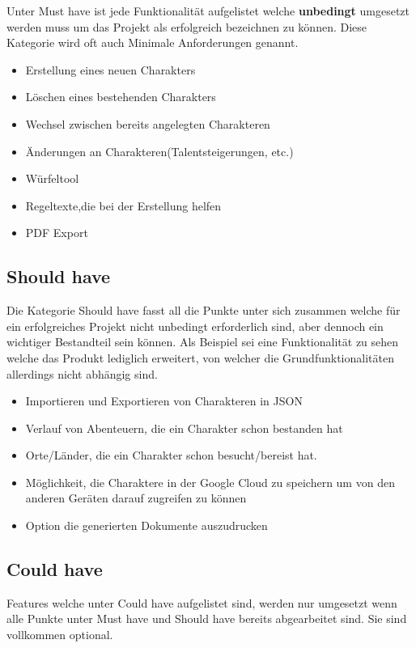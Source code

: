 Unter \grqq Must have\grqq{} ist jede Funktionalität aufgelistet welche \textbf{unbedingt} umgesetzt werden muss um das Projekt als erfolgreich bezeichnen zu können. Diese Kategorie wird oft auch \grqq Minimale Anforderungen\grqq{} genannt.

\begin{itemize}
	\item Erstellung eines neuen Charakters
	\item Löschen eines bestehenden Charakters
	\item Wechsel zwischen bereits angelegten Charakteren
	\item Änderungen an Charakteren(Talentsteigerungen, etc.)
	\item Würfeltool
	\item Regeltexte,die bei der Erstellung helfen
	\item PDF Export
\end{itemize}

\subsection{Should have}

Die Kategorie \grqq Should have\grqq{} fasst all die Punkte unter sich zusammen welche für ein erfolgreiches Projekt nicht unbedingt erforderlich sind, aber dennoch ein wichtiger Bestandteil sein können. Als Beispiel sei eine Funktionalität zu sehen welche das Produkt lediglich erweitert, von welcher die Grundfunktionalitäten allerdings nicht abhängig sind.

\begin{itemize}
	\item Importieren und Exportieren von Charakteren in JSON
	\item Verlauf von Abenteuern, die ein Charakter schon bestanden hat
	\item Orte/Länder, die ein Charakter schon besucht/bereist hat.
	\item Möglichkeit, die Charaktere in der Google Cloud zu speichern um von den anderen Geräten darauf zugreifen zu können
	\item Option die generierten Dokumente auszudrucken
\end{itemize}

\subsection{Could have}

Features welche unter \grqq Could have\grqq{} aufgelistet sind, werden nur umgesetzt wenn alle Punkte unter \grqq Must have\grqq{} und \grqq Should have\grqq{} bereits abgearbeitet sind. Sie sind vollkommen optional.

